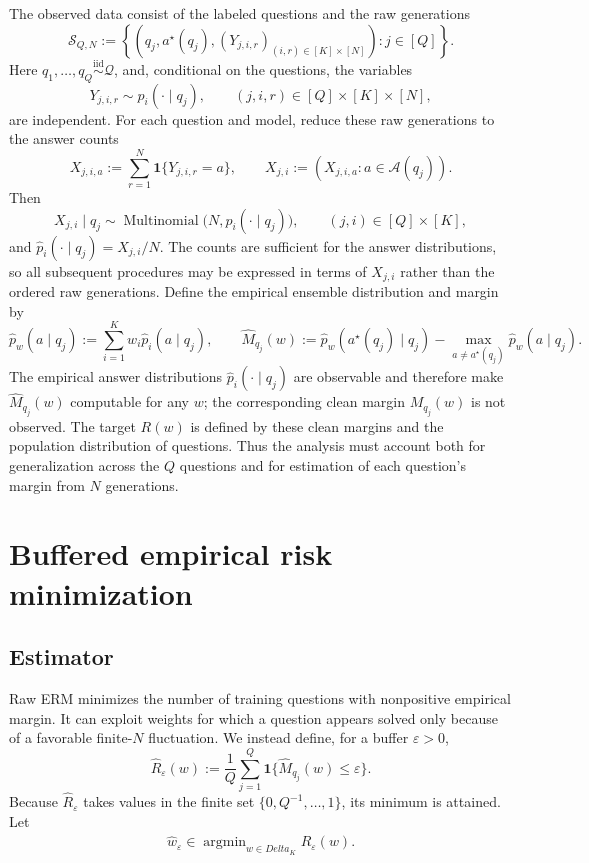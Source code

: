 \documentclass[11pt]{article}
\def\Delta{Delta}%
\newcommand{\one}{\mathbf 1}
\newcommand{\calQ}{\mathcal Q}
\newcommand{\calA}{\mathcal A}
\newcommand{\eps}{\varepsilon}
\DeclareMathOperator*{\argmin}{argmin}
\begin{document}
The observed data consist of the labeled questions and the raw generations
\begin{equation}
\label{eq:training-data}
\mathcal S_{Q,N}
:=
\left\{
\left(q_j,a^\star(q_j),
(Y_{j,i,r})_{(i,r)\in[K]\times[N]}
\right):j\in[Q]
\right\}.
\end{equation}
Here $q_1,\dots,q_Q\overset{\mathrm{iid}}{\sim}\calQ$, and, conditional on the questions, the variables
\[
Y_{j,i,r}\sim p_i(\cdot\mid q_j),
\qquad
(j,i,r)\in[Q]\times[K]\times[N],
\]
are independent.  For each question and model, reduce these raw generations to the answer counts
\[
X_{j,i,a}
:=
\sum_{r=1}^N\one\{Y_{j,i,r}=a\},
\qquad
X_{j,i}:=(X_{j,i,a}:a\in\calA(q_j)).
\]
Then
\begin{equation}
\label{eq:count-model}
X_{j,i}\mid q_j\sim
\operatorname{Multinomial}\bigl(N,p_i(\cdot\mid q_j)\bigr),
\qquad (j,i)\in[Q]\times[K],
\end{equation}
and $\widehat p_i(\cdot\mid q_j)=X_{j,i}/N$.  The counts are sufficient for the answer distributions, so all subsequent procedures may be expressed in terms of $X_{j,i}$ rather than the ordered raw generations.  Define the empirical ensemble distribution and margin by
\[
\widehat p_w(a\mid q_j)
:=
\sum_{i=1}^K w_i\widehat p_i(a\mid q_j),
\qquad
\widehat M_{q_j}(w)
:=
\widehat p_w(a^\star(q_j)\mid q_j)
-\max_{a\ne a^\star(q_j)}\widehat p_w(a\mid q_j).
\]
The empirical answer distributions $\widehat p_i(\cdot\mid q_j)$ are observable and therefore make $\widehat M_{q_j}(w)$ computable for any $w$; the corresponding clean margin $M_{q_j}(w)$ is not observed.  The target $R(w)$ is defined by these clean margins and the population distribution of questions.  Thus the analysis must account both for generalization across the $Q$ questions and for estimation of each question's margin from $N$ generations.

\section{Buffered empirical risk minimization}
\label{sec:buffered}

\subsection{Estimator}

Raw ERM minimizes the number of training questions with nonpositive empirical margin.  It can exploit weights for which a question appears solved only because of a favorable finite-$N$ fluctuation.  We instead define, for a buffer $\eps>0$,
\begin{equation}
\label{eq:buffered-risk}
\widehat R_\eps(w)
:=
\frac1Q\sum_{j=1}^Q\one\{\widehat M_{q_j}(w)\le\eps\}.
\end{equation}
Because $\widehat R_\eps$ takes values in the finite set $\{0,Q^{-1},\dots,1\}$, its minimum is attained.  Let
\begin{equation}
\label{eq:buffered-erm}
\widehat w_\eps
\in
\argmin_{w\in\Delta_K}\widehat R_\eps(w).
\end{equation}
\end{document}
